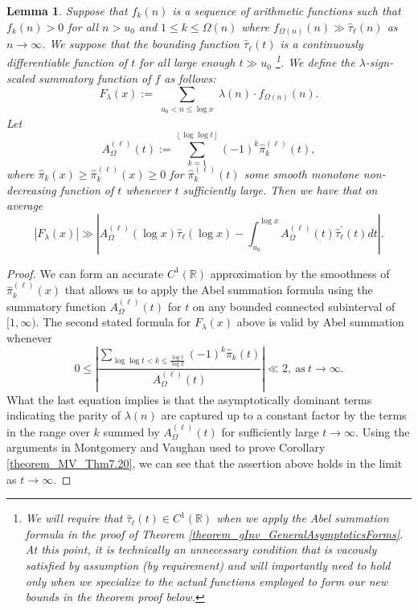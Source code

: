\documentclass[11pt,reqno,a4letter]{article}
\numberwithin{figure}{section}
\numberwithin{table}{section}
\newcommand{\floor}[1]{\left\lfloor #1 \right\rfloor}
\theoremstyle{plain}
\newtheorem{lemma}[theorem]{Lemma}
\numberwithin{theorem}{section}
\theoremstyle{definition}
\newcommand{\SuccSim}[0]{\overset{_{\scriptsize{\blacktriangle}}}{\succsim}}
\renewcommand{\SuccSim}[0]{\ensuremath{\gg}}
\begin{document}
\begin{lemma} 
\label{lemma_CLT_and_AbelSummation} 
Suppose that $f_k(n)$ is a sequence of arithmetic functions 
such that $f_k(n) > 0$ for all $n > u_0$ and $1 \leq k \leq \Omega(n)$ where 
$f_{\Omega(n)}(n) \SuccSim \widehat{\tau}_{\ell}(n)$ as $n \rightarrow \infty$. We suppose that 
the bounding function $\widehat{\tau}_{\ell}(t)$ is a continuously differentiable function of $t$ for all 
large enough $t \gg u_0$ \footnote{ 
     We will require that $\widehat{\tau}_{\ell}(t) \in C^{1}(\mathbb{R})$ when we apply the 
     Abel summation formula in the proof of Theorem \ref{theorem_gInv_GeneralAsymptoticsForms}. 
     At this point, it is technically an unnecessary condition that is 
     vacously satisfied by assumption (by requirement) 
     and will importantly need to hold only when we specialize to the 
     actual functions employed to form our new bounds in the theorem proof below. 
}.  
We define the $\lambda$-sign-scaled summatory function of $f$ as follows: 
\[
F_{\lambda}(x) := \sum_{\substack{u_0 < n \leq \log x}} 
     \lambda(n) \cdot f_{\Omega(n)}(n). 
\]
Let 
\[
A_{\Omega}^{(\ell)}(t) := \sum_{k=1}^{\floor{\log\log t}} (-1)^k \widehat{\pi}_k^{(\ell)}(t),  
\]
where $\widehat{\pi}_k(x) \geq \widehat{\pi}_k^{(\ell)}(x) \geq 0$ for 
$\widehat{\pi}_k^{(\ell)}(t)$ some smooth monotone non-decreasing 
function of $t$ whenever $t$ sufficiently large. 
Then we have that on average 
\[
|F_{\lambda}(x)| \SuccSim \left\lvert 
     A_{\Omega}^{(\ell)}(\log x) \widehat{\tau}_{\ell}(\log x) - 
     \int_{u_0}^{\log x} 
     A_{\Omega}^{(\ell)}(t) \widehat{\tau}_{\ell}^{\prime}(t) dt 
     \right\rvert.  
\]
\end{lemma}
\begin{proof} 
We can form an accurate $C^{1}(\mathbb{R})$ approximation by the smoothness of 
$\widehat{\pi}_k^{(\ell)}(x)$ that allows us to apply the Abel summation formula using the summatory 
function $A_{\Omega}^{(\ell)}(t)$ for $t$ on any bounded connected subinterval of $[1, \infty)$. 
The second stated formula for $F_{\lambda}(x)$ above is valid by Abel summation whenever 
\[
0 \leq \left\lvert \frac{\displaystyle\sum\limits_{\log\log t < k \leq \frac{\log t}{\log 2}} 
     (-1)^k \widehat{\pi}_k(t)}{A_{\Omega}^{(\ell)}(t)}\right\rvert \ll 2, 
     \mathrm{\ as\ } t \rightarrow \infty. 
\]
What the last equation implies is that the asymptotically dominant terms indicating the parity of 
$\lambda(n)$ are captured up to a constant factor 
by the terms in the range over $k$ summed by 
$A_{\Omega}^{(\ell)}(t)$ for 
sufficiently large $t \rightarrow \infty$. 
Using the arguments in Montgomery and Vaughan \cite[\S 7; Thm.\ 7.20]{MV} used to prove 
Corollary \ref{theorem_MV_Thm7.20}, we can see that 
the assertion above holds in the limit as $t \rightarrow \infty$. 
\end{proof} 
\end{document}
